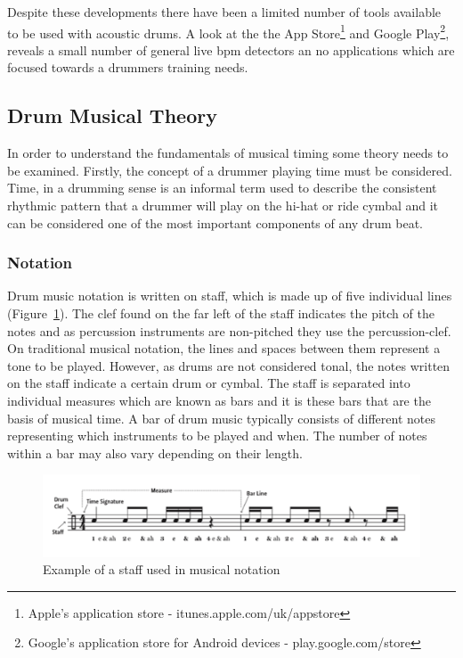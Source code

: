 \documentclass[a4paper, 11pt]{article}
\begin{document}
Despite these developments there have been a limited number of tools available to be used with acoustic drums. A look at the the App Store\footnote{Apple's application store - itunes.apple.com/uk/appstore‎} and Google Play\footnote{Google's application store for Android devices - play.google.com/store}, reveals a small number of general live bpm detectors an no applications which are focused towards a drummers training needs.\par

\subsection{Drum Musical Theory}
In order to understand the fundamentals of musical timing some theory needs to be examined. Firstly, the concept of a drummer playing time must be considered. Time, in a drumming sense is an informal term used to describe the consistent rhythmic pattern that a drummer will play on the hi-hat or ride cymbal \cite{drum-bible} and it can be considered one of the most important components of any drum beat. 

\subsubsection{Notation}
Drum music notation is written on staff, which is made up of five individual lines (Figure~\ref{fig: staff}). The clef found on the far left of the staff indicates the pitch of the notes \cite{oxford-comp} and as percussion instruments are non-pitched they use the percussion-clef. On traditional musical notation, the lines and spaces between them represent a tone to be played. However, as drums are not considered tonal, the notes written on the staff indicate a certain drum or cymbal. The staff is separated into individual measures which are known as bars \cite{drum-note} and it is these bars that are the basis of musical time. A bar of drum music typically consists of different notes representing which instruments to be played and when. The number of notes within a bar may also vary depending on their length. 

\begin{figure}
	\centering
	\includegraphics[scale=0.3]{images/staff.jpg}
	\caption{Example of a staff used in musical notation}
	\label{fig: staff}
\end{figure}
\end{document}
